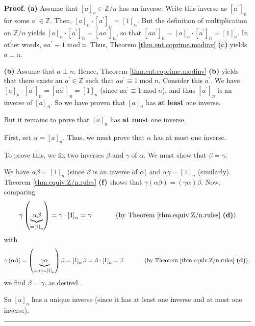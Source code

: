 \documentclass[numbers=enddot,12pt,final,onecolumn,notitlepage]{scrartcl}%
\numberwithin{exer}{subsection}
\theoremstyle{definition}
\newenvironment{proof}[1][Proof]{\noindent\textbf{#1.} }{\ \rule{0.5em}{0.5em}}
\begin{document}
\begin{proof}
\textbf{(a)} Assume that $\left[  a\right]  _{n}\in\mathbb{Z}/n$ has an
inverse. Write this inverse as $\left[  a^{\prime}\right]  _{n}$ for some
$a^{\prime}\in\mathbb{Z}$. Then, $\left[  a\right]  _{n}\cdot\left[
a^{\prime}\right]  _{n}=\left[  1\right]  _{n}$. But the definition of
multiplication on $\mathbb{Z}/n$ yields $\left[  a\right]  _{n}\cdot\left[
a^{\prime}\right]  _{n}=\left[  aa^{\prime}\right]  _{n}$, so that $\left[
aa^{\prime}\right]  _{n}=\left[  a\right]  _{n}\cdot\left[  a^{\prime}\right]
_{n}=\left[  1\right]  _{n}$. In other words, $aa^{\prime}\equiv
1\operatorname{mod}n$. Thus, Theorem \ref{thm.ent.coprime.modinv} \textbf{(c)}
yields $a\perp n$.

\textbf{(b)} Assume that $a\perp n$. Hence, Theorem
\ref{thm.ent.coprime.modinv} \textbf{(b)} yields that there exists an
$a^{\prime}\in\mathbb{Z}$ such that $aa^{\prime}\equiv1\operatorname{mod}n$.
Consider this $a^{\prime}$. We have $\left[  a\right]  _{n}\cdot\left[
a^{\prime}\right]  _{n}=\left[  aa^{\prime}\right]  _{n}=\left[  1\right]
_{n}$ (since $aa^{\prime}\equiv1\operatorname{mod}n$), and thus $\left[
a^{\prime}\right]  _{n}$ is an inverse of $\left[  a\right]  _{n}$. So we have
proven that $\left[  a\right]  _{n}$ has \textbf{at least }one inverse.

But it remains to prove that $\left[  a\right]  _{n}$ has \textbf{at most} one inverse.

First, set $\alpha=\left[  a\right]  _{n}$. Thus, we must prove that $\alpha$
has at most one inverse.

To prove this, we fix two inverses $\beta$ and $\gamma$ of $\alpha$. We must
show that $\beta=\gamma$.

We have $\alpha\beta=\left[  1\right]  _{n}$ (since $\beta$ is an inverse of
$\alpha$) and $\alpha\gamma=\left[  1\right]  _{n}$ (similarly). Theorem
\ref{thm.equiv.Z/n.rules} \textbf{(f)} shows that $\gamma\left(  \alpha
\beta\right)  =\left(  \gamma\alpha\right)  \beta$. Now, comparing
\[
\gamma\left(  \underbrace{\alpha\beta}_{=\left[  1\right]  _{n}}\right)
=\gamma\cdot\left[  1\right]  _{n}=\gamma\ \ \ \ \ \ \ \ \ \ \left(  \text{by
Theorem \ref{thm.equiv.Z/n.rules} \textbf{(d)}}\right)
\]
with%
\[
\gamma\left(  \alpha\beta\right)  =\left(  \underbrace{\gamma\alpha}%
_{=\alpha\gamma=\left[  1\right]  _{n}}\right)  \beta=\left[  1\right]
_{n}\beta=\beta\cdot\left[  1\right]  _{n}=\beta\ \ \ \ \ \ \ \ \ \ \left(
\text{by Theorem \ref{thm.equiv.Z/n.rules} \textbf{(d)}}\right)  ,
\]
we find $\beta=\gamma$, as desired.

So $\left[  a\right]  _{n}$ has a unique inverse (since it has at least one
inverse and at most one inverse).
\end{proof}
\end{document}
